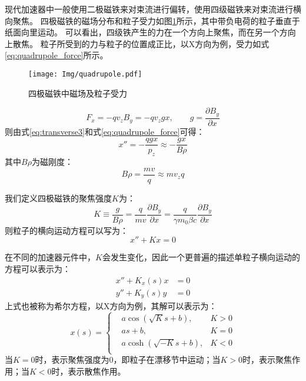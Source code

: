 现代加速器中一般使用二极磁铁来对束流进行偏转，使用四级磁铁来对束流进行横向聚焦。
四极磁铁的磁场分布和粒子受力如图\ref{fig:quadrupole}所示\cite{qinq2011ring}，其中带负电荷的粒子垂直于纸面向里运动。
可以看出，四级铁产生的力在一个方向上聚焦，而在另一个方向上散焦。
粒子所受到的力与粒子的位置成正比，以X方向为例，受力如式\ref{eq:quadrupole_force}所示。
\begin{figure}[!htb]
    \centering
    \texttt{[image: Img/quadrupole.pdf]}
    \caption{四极磁铁中磁场及粒子受力}
    \label{fig:quadrupole}
\end{figure}
\begin{equation}
    \label{eq:quadrupole_force}
    F_x = -q {v}_{z} {B}_{y} = -q {v}_{z} g x, \qquad g=\frac{\partial B_y}{\partial x}
\end{equation}
则由式\ref{eq:transverse3}和式\ref{eq:quadrupole_force}可得：
\begin{equation}
    \label{eq:quadrupole_force2}
    x'' = -\frac{qgx}{p_z} \approx -\frac{gx}{B\rho}
\end{equation}
其中${B\rho}$为磁刚度：
\begin{equation}
    {B\rho}=\frac{mv}{q}\approx{mv_z}{q}
\end{equation}

我们定义四极磁铁的聚焦强度$K$为：
\begin{equation}
    \label{eq:quadrupole_force3}
    K \equiv \frac{g}{B\rho} = \frac{q}{mv}                 \frac{\partial B_y}{\partial x}
                             = \frac{q}{\gamma m_0 \beta c} \frac{\partial B_y}{\partial x}
\end{equation}
则粒子的横向运动方程可以写为：
\begin{equation}
    \label{eq:Mathier_Hill_x}
    x'' + Kx =0
\end{equation}

在不同的加速器元件中，$K$会发生变化，因此一个更普遍的描述单粒子横向运动的方程可以表示为：
\begin{equation}
    \label{eq:Mathier_Hill}
    \begin{aligned}
        x'' + K_x(s)x &= 0 \\
        y'' + K_y(s)y &= 0
    \end{aligned}
\end{equation}
上式也被称为希尔方程，以X方向为例，其解可以表示为\cite{abramowitz1964handbook}：
\begin{equation}
    \label{eq:Mathier_Hill_solver}
    x(s)=\left\{
    \begin{aligned}
        &a\cos (\sqrt{K}s+b) ,& K>0 \\
        &as+b                ,& K=0 \\
        &a\cosh(\sqrt{-K}s+b),& K<0 \\
    \end{aligned}
    \right.
\end{equation}
当$K=0$时，表示聚焦强度为0，即粒子在漂移节中运动；当$K>0$时，表示聚焦作用；当$K<0$时，表示散焦作用。

